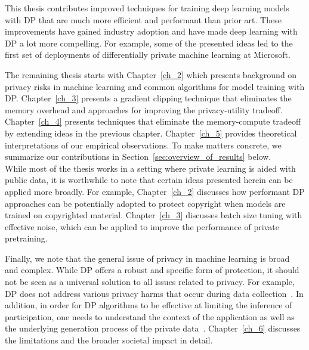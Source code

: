 This thesis contributes improved techniques for training deep learning models with DP that are much more efficient and performant than prior art.
These improvements have gained industry adoption and have made deep learning with DP a lot more compelling.
For example, some of the presented ideas led to the first set of deployments of differentially private machine learning at Microsoft.

The remaining thesis starts with Chapter~\ref{ch_2} which presents background on privacy risks in machine learning and common algorithms for model training with DP.
Chapter~\ref{ch_3} presents a gradient clipping technique that eliminates the memory overhead and approaches for improving the privacy-utility tradeoff.
Chapter~\ref{ch_4} presents techniques that eliminate the memory-compute tradeoff by extending ideas in the previous chapter.
Chapter~\ref{ch_5} provides theoretical interpretations of our empirical observations.
To make matters concrete, we summarize our contributions in Section~\ref{sec:overview_of_results} below.\\

While most of the thesis works in a setting where private learning is aided with public data, it is worthwhile to note that certain ideas presented herein can be applied more broadly. 
For example, Chapter~\ref{ch_2} discusses how performant DP approaches can be potentially adopted to protect copyright when models are trained on copyrighted material.
Chapter~\ref{ch_3} discusses batch size tuning with effective noise, which can be applied to improve the performance of private pretraining.

Finally, we note that the general issue of privacy in machine learning is broad and complex.
While DP offers a robust and specific form of protection, it should not be seen as a universal solution to all issues related to privacy.
For example, DP does not address various privacy harms that occur during data collection~\cite{solove2005taxonomy}.
In addition, in order for DP algorithms to be effective at limiting the inference of participation, one needs to understand the context of the application as well as the underlying generation process of the private data~\cite{kifer2011no}. 
Chapter~\ref{ch_6} discusses the limitations and the broader societal impact in detail.

